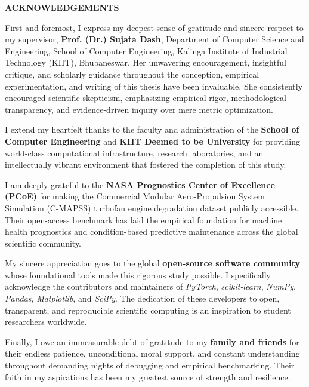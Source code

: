 \documentclass[12pt,a4paper,oneside]{report}
\begin{document}
\newpage
\thispagestyle{plain}
\begin{center}
    {\LARGE \textbf{ACKNOWLEDGEMENTS}}\\[1.5cm]
\end{center}

First and foremost, I express my deepest sense of gratitude and sincere respect to my supervisor, \textbf{Prof. (Dr.) Sujata Dash}, Department of Computer Science and Engineering, School of Computer Engineering, Kalinga Institute of Industrial Technology (KIIT), Bhubaneswar. Her unwavering encouragement, insightful critique, and scholarly guidance throughout the conception, empirical experimentation, and writing of this thesis have been invaluable. She consistently encouraged scientific skepticism, emphasizing empirical rigor, methodological transparency, and evidence-driven inquiry over mere metric optimization.

I extend my heartfelt thanks to the faculty and administration of the \textbf{School of Computer Engineering} and \textbf{KIIT Deemed to be University} for providing world-class computational infrastructure, research laboratories, and an intellectually vibrant environment that fostered the completion of this study.

I am deeply grateful to the \textbf{NASA Prognostics Center of Excellence (PCoE)} for making the Commercial Modular Aero-Propulsion System Simulation (C-MAPSS) turbofan engine degradation dataset publicly accessible. Their open-access benchmark has laid the empirical foundation for machine health prognostics and condition-based predictive maintenance across the global scientific community.

My sincere appreciation goes to the global \textbf{open-source software community} whose foundational tools made this rigorous study possible. I specifically acknowledge the contributors and maintainers of \textit{PyTorch}, \textit{scikit-learn}, \textit{NumPy}, \textit{Pandas}, \textit{Matplotlib}, and \textit{SciPy}. The dedication of these developers to open, transparent, and reproducible scientific computing is an inspiration to student researchers worldwide.

Finally, I owe an immeasurable debt of gratitude to my \textbf{family and friends} for their endless patience, unconditional moral support, and constant understanding throughout demanding nights of debugging and empirical benchmarking. Their faith in my aspirations has been my greatest source of strength and resilience.
\end{document}
